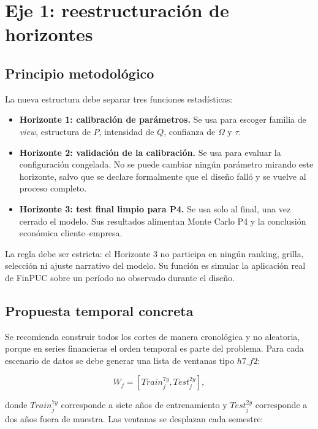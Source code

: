 \documentclass[11pt]{article}
\begin{document}
\section{Eje 1: reestructuraci\'on de horizontes}

\subsection{Principio metodol\'ogico}

La nueva estructura debe separar tres funciones estad\'isticas:

\begin{itemize}
    \item \textbf{Horizonte 1: calibraci\'on de par\'ametros.} Se usa para escoger familia de \textit{view}, estructura de $P$, intensidad de $Q$, confianza de $\Omega$ y $\tau$.
    \item \textbf{Horizonte 2: validaci\'on de la calibraci\'on.} Se usa para evaluar la configuraci\'on congelada. No se puede cambiar ning\'un par\'ametro mirando este horizonte, salvo que se declare formalmente que el dise\~no fall\'o y se vuelve al proceso completo.
    \item \textbf{Horizonte 3: test final limpio para P4.} Se usa solo al final, una vez cerrado el modelo. Sus resultados alimentan Monte Carlo P4 y la conclusi\'on econ\'omica cliente--empresa.
\end{itemize}

La regla debe ser estricta: el Horizonte 3 no participa en ning\'un ranking, grilla, selecci\'on ni ajuste narrativo del modelo. Su funci\'on es simular la aplicaci\'on real de FinPUC sobre un per\'iodo no observado durante el dise\~no.

\subsection{Propuesta temporal concreta}

Se recomienda construir todos los cortes de manera cronol\'ogica y no aleatoria, porque en series financieras el orden temporal es parte del problema. Para cada escenario de datos se debe generar una lista de ventanas tipo $h7\_f2$:

\[
W_j = \left[Train_j^{7y}, Test_j^{2y}\right],
\]

donde $Train_j^{7y}$ corresponde a siete a\~nos de entrenamiento y $Test_j^{2y}$ corresponde a dos a\~nos fuera de muestra. Las ventanas se desplazan cada semestre:
\end{document}
